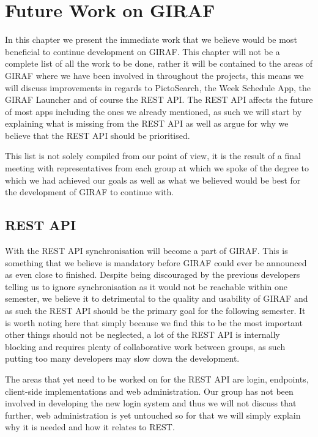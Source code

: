 \chapter{Future Work on GIRAF}\label{chp:futureworks}
In this chapter we present the immediate work that we believe would be most beneficial to continue development on GIRAF.
This chapter will not be a complete list of all the work to be done, rather it will be contained to the areas of GIRAF where we have been involved in throughout the projects, this means we will discuss improvements in regards to PictoSearch, the Week Schedule App, the GIRAF Launcher and of course the REST API.
The REST API affects the future of most apps including the ones we already mentioned, as such we will start by explaining what is missing from the REST API as well as argue for why we believe that the REST API should be prioritised.

This list is not solely compiled from our point of view, it is the result of a final meeting with representatives from each group at which we spoke of the degree to which we had achieved our goals as well as what we believed would be best for the development of GIRAF to continue with.

\section{REST API}
With the REST API synchronisation will become a part of GIRAF.
This is something that we believe is mandatory before GIRAF could ever be announced as even close to finished.
Despite being discouraged by the previous developers telling us to ignore synchronisation as it would not be reachable within one semester, we believe it to detrimental to the quality and usability of GIRAF and as such the REST API should be the primary goal for the following semester.
It is worth noting here that simply because we find this to be the most important other things should not be neglected, a lot of the REST API is internally blocking and requires plenty of collaborative work between groups, as such putting too many developers may slow down the development.

The areas that yet need to be worked on for the REST API are login, endpoints, client-side implementations and web administration.
Our group has not been involved in developing the new login system and thus we will not discuss that further, web administration is yet untouched so for that we will simply explain why it is needed and how it relates to REST. 
